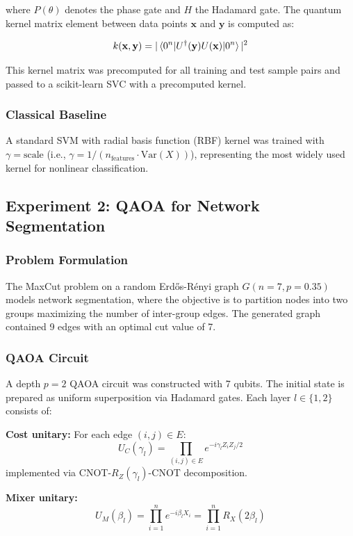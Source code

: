 \documentclass[conference]{IEEEtran}
\begin{document}
where $P(\theta)$ denotes the phase gate and $H$ the Hadamard gate. The quantum kernel matrix element between data points $\mathbf{x}$ and $\mathbf{y}$ is computed as:

\begin{equation}
k(\mathbf{x}, \mathbf{y}) = |\braket{0^n | U^{\dagger}(\mathbf{y}) U(\mathbf{x}) | 0^n}|^2
\end{equation}

This kernel matrix was precomputed for all training and test sample pairs and passed to a scikit-learn SVC with a precomputed kernel.

\subsubsection{Classical Baseline}
A standard SVM with radial basis function (RBF) kernel was trained with $\gamma = \text{scale}$ (i.e., $\gamma = 1/(n_{\text{features}} \cdot \text{Var}(X))$), representing the most widely used kernel for nonlinear classification.

\subsection{Experiment 2: QAOA for Network Segmentation}

\subsubsection{Problem Formulation}
The MaxCut problem on a random Erd\H{o}s-R\'{e}nyi graph $G(n=7, p=0.35)$ models network segmentation, where the objective is to partition nodes into two groups maximizing the number of inter-group edges. The generated graph contained 9 edges with an optimal cut value of 7.

\subsubsection{QAOA Circuit}
A depth $p=2$ QAOA circuit was constructed with 7 qubits. The initial state is prepared as uniform superposition via Hadamard gates. Each layer $l \in \{1, 2\}$ consists of:

\textbf{Cost unitary:} For each edge $(i, j) \in E$:
\begin{equation}
U_C(\gamma_l) = \prod_{(i,j) \in E} e^{-i \gamma_l Z_i Z_j / 2}
\end{equation}
implemented via CNOT-$R_Z(\gamma_l)$-CNOT decomposition.

\textbf{Mixer unitary:}
\begin{equation}
U_M(\beta_l) = \prod_{i=1}^{n} e^{-i \beta_l X_i} = \prod_{i=1}^{n} R_X(2\beta_l)
\end{equation}
\end{document}
